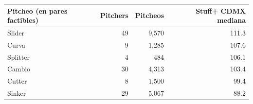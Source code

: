 \begin{tabular}{lrrr}
\toprule
Pitcheo (en pares factibles) & Pitchers & Pitcheos & Stuff+ CDMX mediana \\
\midrule
Slider & 49 & 9,570 & 111.3 \\
Curva & 9 & 1,285 & 107.6 \\
Splitter & 4 & 484 & 106.1 \\
Cambio & 30 & 4,313 & 103.4 \\
Cutter & 8 & 1,500 & 99.4 \\
Sinker & 29 & 5,067 & 88.2 \\
\bottomrule
\end{tabular}
